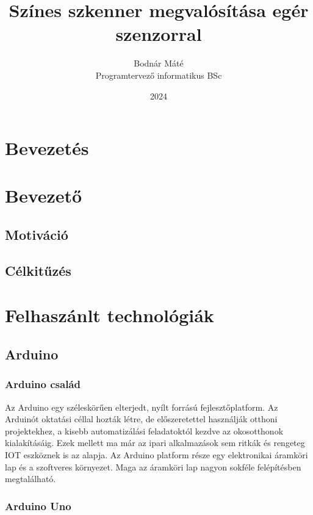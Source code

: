 \documentclass[]{thesis-ekf}
\theoremstyle{definition}
\theoremstyle{remark}
\begin{document}
\title{Színes szkenner megvalósítása egér szenzorral}
\author{Bodnár Máté\\Programtervező informatikus BSc}
\date{2024}
\maketitle

\tableofcontents

\chapter*{Bevezetés}


\chapter{Bevezető}

\section{Motiváció}
\section{Célkitűzés}

\chapter{Felhaszánlt technológiák}
\section{Arduino}
\subsection{Arduino család}
Az Arduino egy széleskörűen elterjedt, nyílt forrású fejlesztőplatform. Az Arduinót oktatási céllal hozták létre, de előszeretettel használják otthoni projektekhez, a kisebb automatizálási feladatoktól kezdve az okosotthonok kialakításáig. Ezek mellett ma már az ipari alkalmazások sem ritkák és rengeteg IOT eszköznek is az alapja. Az Arduino platform része egy elektronikai áramköri lap és a szoftveres környezet. Maga az áramköri lap nagyon sokféle felépítésben megtalálható.
\subsection{Arduino Uno}
\end{document}
